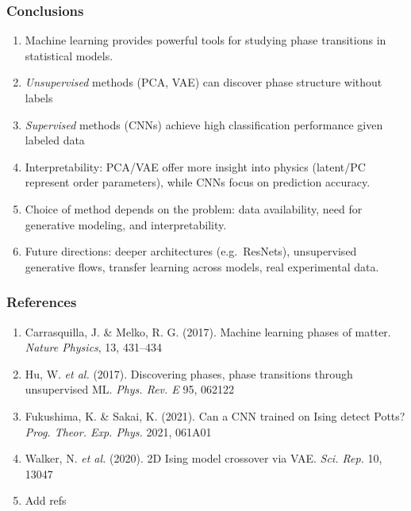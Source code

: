 \documentclass{beamer}
\begin{document}
\begin{frame}
\frametitle{Conclusions}

\begin{enumerate}
\item Machine learning provides powerful tools for studying phase transitions in statistical models.

\item \emph{Unsupervised} methods (PCA, VAE) can discover phase structure without labels 

\item \emph{Supervised} methods (CNNs) achieve high classification performance given labeled data 

\item Interpretability: PCA/VAE offer more insight into physics (latent/PC represent order parameters), while CNNs focus on prediction accuracy.

\item Choice of method depends on the problem: data availability, need for generative modeling, and interpretability.

\item Future directions: deeper architectures (e.g.\ ResNets), unsupervised generative flows, transfer learning across models, real experimental data.
\end{enumerate}

\noindent
\end{frame}

\begin{frame}
\frametitle{References}

\begin{enumerate}
\item Carrasquilla, J. \& Melko, R. G. (2017). Machine learning phases of matter. \emph{Nature Physics}, 13, 431–434 

\item Hu, W. \textit{et al.} (2017). Discovering phases, phase transitions through unsupervised ML. \emph{Phys. Rev. E} 95, 062122 

\item Fukushima, K. \& Sakai, K. (2021). Can a CNN trained on Ising detect Potts? \emph{Prog. Theor. Exp. Phys.} 2021, 061A01 

\item Walker, N. \textit{et al.} (2020). 2D Ising model crossover via VAE. \emph{Sci. Rep.} 10, 13047

\item Add refs
\end{enumerate}

\noindent
\end{frame}
\end{document}

